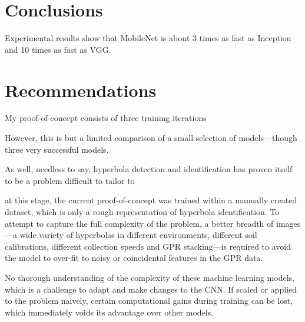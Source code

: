 \documentclass[se,blockletter]{uw-wkrpt}
\begin{document}
\section{Conclusions}
Experimental results show that MobileNet is about 3 times as fast as Inception and 10 times as fast as VGG.




\section{Recommendations}
My proof-of-concept consists of three training iterations


However, this is but a limited comparison of a small selection of models---though three very successful models. 


As well, needless to say, 
hyperbola detection and identification has proven itself to be a problem difficult to tailor to 


at this stage, the current proof-of-concept was trained within a manually created dataset, which is only a rough representation of hyperbola identification. To attempt to capture the full complexity of the problem, a better breadth of images---a wide variety of hyperbolas in different environments, different soil calibrations, different collection speeds and GPR stacking---is required to avoid the model to over-fit to noisy or coincidental features in the GPR data.


No thorough understanding of the complexity of these machine learning models, which is a challenge to adapt and make changes to the CNN.
If scaled or applied to the problem naively, certain computational gains during training can be lost, which immediately voids its advantage over other models. 

\backmatter

%
\printbibliography[heading=bibintoc]
\end{document}
